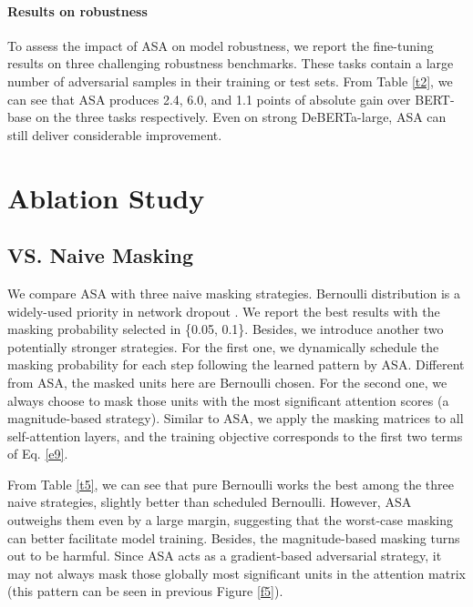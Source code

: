 \documentclass[letterpaper]{article} \usepackage{aaai23}  \usepackage{times}  \usepackage{helvet}  \usepackage{courier}  \usepackage[hyphens]{url}  \usepackage{graphicx} \urlstyle{rm} \def\UrlFont{\rm}  \usepackage{natbib}  \usepackage{caption} \frenchspacing  \setlength{\pdfpagewidth}{8.5in}  \setlength{\pdfpageheight}{11in}  \usepackage{algorithm}
\begin{document}
\paragraph{Results on robustness} To assess the impact of ASA on model robustness, we report the fine-tuning results on three challenging robustness benchmarks. These tasks contain a large number of adversarial samples in their training or test sets. From Table \ref{t2}, we can see that ASA produces 2.4, 6.0, and 1.1 points of absolute gain over BERT-base on the three tasks respectively. Even on strong DeBERTa-large, ASA can still deliver considerable improvement.


\section{Ablation Study}
\label{s5}

\subsection{VS. Naive Masking}

We compare ASA with three naive masking strategies. Bernoulli distribution is a widely-used priority in network dropout \citep{DBLP:journals/jmlr/SrivastavaHKSS14}. We report the best results with the masking probability selected in \{0.05, 0.1\}. Besides, we introduce another two potentially stronger strategies. For the first one, we dynamically schedule the masking probability for each step following the learned pattern by ASA. Different from ASA, the masked units here are Bernoulli chosen. For the second one, we always choose to mask those units with the most significant attention scores (a magnitude-based strategy). Similar to ASA, we apply the masking matrices to all self-attention layers, and the training objective corresponds to the first two terms of Eq. \ref{e9}.

From Table \ref{t5}, we can see that pure Bernoulli works the best among the three naive strategies, slightly better than scheduled Bernoulli. However, ASA outweighs them even by a large margin, suggesting that the worst-case masking can better facilitate model training. Besides, the magnitude-based masking turns out to be harmful. Since ASA acts as a gradient-based adversarial strategy, it may not always mask those globally most significant units in the attention matrix (this pattern can be seen in previous Figure \ref{f5}).
\end{document}
